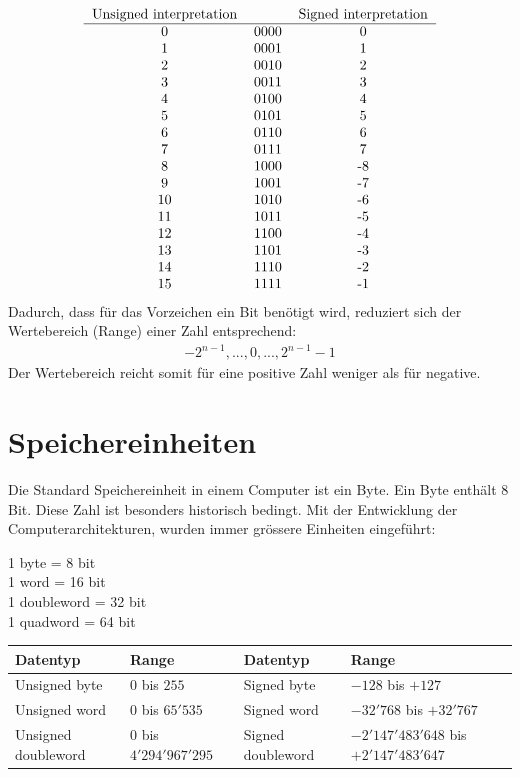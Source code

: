 \documentclass[a4paper,10pt]{report}
\begin{document}
\begin{equation*}\begin{tabular}{c c c}
Unsigned interpretation & & Signed interpretation \\
\hline
0 & 0000 & 0\\
1 & 0001 & 1\\
2 & 0010 & 2\\
3 & 0011 & 3\\
4 & 0100 & 4\\
5 & 0101 & 5\\
6 & 0110 & 6\\
7 & 0111 & 7\\
8 & 1000 & -8\\
9 & 1001 & -7\\
10 & 1010 & -6\\
11 & 1011 & -5\\
12 & 1100 & -4\\
13 & 1101 & -3\\
14 & 1110 & -2\\
15 & 1111 & -1\\ \end{tabular} 
\end{equation*}
Dadurch, dass für das Vorzeichen ein Bit benötigt wird, reduziert sich der Wertebereich (Range) einer Zahl entsprechend:
\begin{eqnarray*}-2^{n-1}, ..., 0, ..., 2^{n-1} - 1 \end{eqnarray*}
Der Wertebereich reicht somit für eine positive Zahl weniger als für negative.
\section{Speichereinheiten}
Die Standard Speichereinheit in einem Computer ist ein Byte. Ein Byte enthält 8 Bit. Diese Zahl ist besonders historisch bedingt. Mit der Entwicklung der Computerarchitekturen, wurden immer grössere Einheiten eingeführt:
\begin{center}
1 byte = 8 bit\\
1 word = 16 bit\\
1 doubleword = 32 bit\\
1 quadword = 64 bit\\
\end{center}
\begin{center}
	\begin{tabular}{l|l|l|l}
			\textbf{Datentyp} & \textbf{Range} & \textbf{Datentyp} & \textbf{Range}\\\hline
			Unsigned byte & $0$ bis $255$ & Signed byte & $-128$ bis $+127$\\\hline
			Unsigned word  & $0$ bis $65'535$ & Signed word & $-32'768$ bis $+32'767$\\\hline
			Unsigned doubleword & $0$ bis $4'294'967'295$ & Signed doubleword & $-2'147'483'648$ bis $+2'147'483'647$\\				
\end{tabular}
\end{center}
\end{document}
